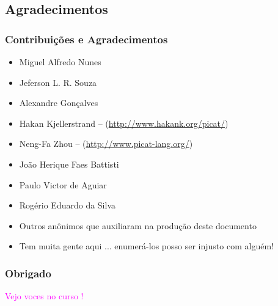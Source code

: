 \subsection{Agradecimentos}

\begin{frame}[fragile]
  \frametitle{Contribuições e Agradecimentos}

  \begin{itemize}
  \item Miguel Alfredo Nunes
  \item Jeferson L. R. Souza
    \item Alexandre Gonçalves 
    \item Hakan Kjellerstrand -- (\url{http://www.hakank.org/picat/})
    \item Neng-Fa Zhou -- (\url{http://www.picat-lang.org/})
    \item João Herique Faes Battisti
    \item Paulo Victor de Aguiar
    \item Rogério Eduardo da Silva
    \item Outros anônimos que auxiliaram na produção deste documento
    \item Tem muita gente aqui ... enumerá-los posso ser injusto com alguém!
  \end{itemize}

\end{frame}


\begin{frame}[fragile]
  \frametitle{Obrigado}

\begin{LARGE}
\begin{center}
\textcolor{magenta}{Vejo voces no curso !}
\end{center}
\end{LARGE}

\end{frame}
						
